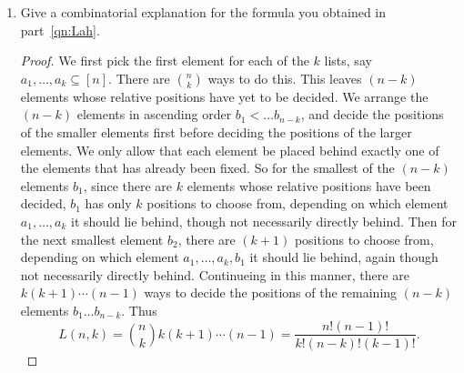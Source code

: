 \documentclass{article}
\begin{document}
\begin{enumerate}[label={(\alph*)}]
\begin{proof}
        Observe that $[x^n](1+x+x^2+\ldots)^k$ is the same as the number of
        $k$-tuples of non-negative integers that sum to $n$, which is the
        same as number of weak compositions of $n$ into $k$ parts, which
        equals $\binom{n+k-1}{n}$ (Proposition 13.3). Thus we can further
        simplify
        \begin{align*}
          A(x,y) &=\sum_{k\geq0} \frac{x^ky^k}{k!} (1+x+x^2+\ldots)^k\\
          &=\sum_{k\geq0} \frac{x^ky^k}{k!} \sum_{n\geq0} \binom{n+k-1}{n}
            x^n\\
          &=\sum_{n,k\geq0} \frac{1}{k!} \binom{n+k-1}{n} x^{n+k}y^k\\
          &=\sum_{n,k\geq0} \frac{(n+k-1)!}{k!n!(k-1)!}
            x^{n+k}y^k,\\
          &=\sum_{n,k\geq0} \frac{(n-1)!}{k!(n-k)!(k-1)!} x^{n}y^k.\\
        \end{align*}

        Then
        \begin{align*}
          L(n,k) &=\left[\frac{x^ny^k}{n!}\right] A(x,y)\\
          &=\frac{n!(n-1)!}{k!(n-k)!(k-1)!}.\\
        \end{align*}
      \end{proof}

    \item Give a combinatorial explanation for the formula you obtained in
      part~\ref{qn:Lah}.
      \begin{proof}
        We first pick the first element for each of the $k$ lists, say
        $a_1,\ldots,a_k\subseteq[n]$. There
        are $\binom{n}{k}$ ways to do this. This leaves $(n-k)$ elements
        whose relative positions have yet to be decided. We arrange the
        $(n-k)$ elements in ascending order $b_1<\ldots b_{n-k}$, and
        decide the positions of the smaller elements first before deciding
        the positions of the larger elements. We only allow that each
        element be placed behind exactly one of the elements that has
        already been fixed. So for the smallest of the $(n-k)$ elements
        $b_1$, since there are $k$ elements whose relative positions have
        been decided, $b_1$ has only $k$ positions to choose from,
        depending on which element $a_1,\ldots,a_k$ it should lie behind,
        though not necessarily directly behind. Then for the next smallest
        element $b_2$, there are $(k+1)$ positions to choose from,
        depending on which element $a_1,\ldots,a_k,b_1$ it should lie behind,
        again though not necessarily directly behind. Continueing in this
        manner, there are $k(k+1)\cdots(n-1)$ ways to decide the positions
        of the remaining $(n-k)$ elements $b_1\ldots b_{n-k}$. Thus
        \[L(n,k) =\binom{n}{k} k(k+1)\cdots(n-1)
        =\frac{n!(n-1)!}{k!(n-k)!(k-1)!}.\]
      \end{proof}


\end{enumerate}
\end{document}
